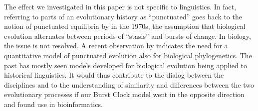 \documentclass[]{rsos}%
\begin{document}
The effect we investigated in this paper
is not specific to linguistics. In fact, referring to parts
of an evolutionary history as “punctuated” goes back to the notion of
punctuated equilibria by \textcite{eldredge1972punctuated} in the 1970s, the
assumption that biological evolution alternates between periods of “stasis” and
bursts of change.
In biology, the issue is not resolved. A recent observation by
\textcite{janzen2021nucleotide} indicates the need for a quantitative model of
punctuated evolution also for biological phylogenetics.
The past has mostly seen models developed for biological evolution being applied to
historical linguistics.
It would thus contribute to the dialog between the disciplines and to the
understanding of similarity
and differences between the two evolutionary processes
\parencite{list2016alignment,levinson2012tools,SOMETHING-BETTER?}
if our Burst Clock model went in the opposite direction and
found use in bioinformatics.


\printbibliography{}
\end{document}
